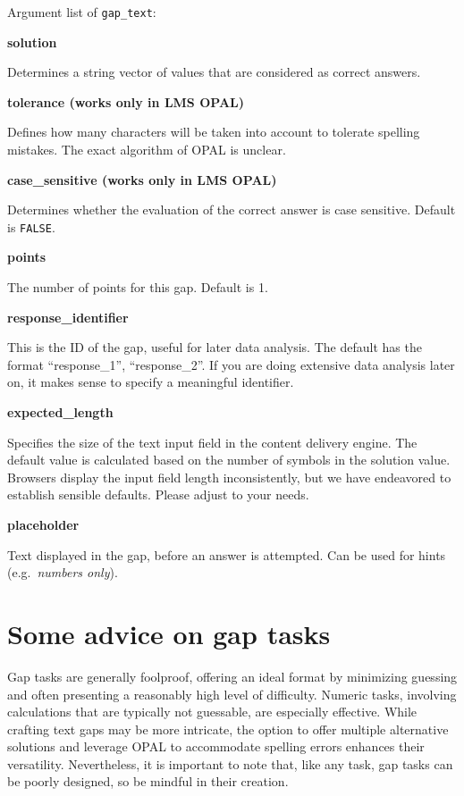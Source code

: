 \documentclass[twoside]{tufte-book}
\begin{document}
Argument list of \texttt{gap\_text}:

\noindent\textbf{solution}\label{solution-1}

Determines a string vector of values that are considered as correct answers.

\noindent\textbf{tolerance (works only in LMS OPAL)}\label{tolerance-works-only-in-lms-opal}

Defines how many characters will be taken into account to tolerate spelling mistakes. The exact algorithm of OPAL is unclear.

\noindent\textbf{case\_sensitive (works only in LMS OPAL)}\label{case_sensitive-works-only-in-lms-opal}

Determines whether the evaluation of the correct answer is case sensitive. Default is \texttt{FALSE}.

\noindent\textbf{points}\label{points-3}

The number of points for this gap. Default is 1.

\noindent\textbf{response\_identifier}\label{response_identifier-1}

This is the ID of the gap, useful for later data analysis. The default has the format ``response\_1'', ``response\_2''. If you are doing extensive data analysis later on, it makes sense to specify a meaningful identifier.

\noindent\textbf{expected\_length}\label{expected_length-1}

Specifies the size of the text input field in the content delivery engine. The default value is calculated based on the number of symbols in the solution value. Browsers display the input field length inconsistently, but we have endeavored to establish sensible defaults. Please adjust to your needs.

\noindent\textbf{placeholder}\label{placeholder-1}

Text displayed in the gap, before an answer is attempted. Can be used for hints (e.g.~\emph{numbers only}).

\section{Some advice on gap tasks}\label{some-advice-on-gap-tasks}

Gap tasks are generally foolproof, offering an ideal format by minimizing guessing and often presenting a reasonably high level of difficulty. Numeric tasks, involving calculations that are typically not guessable, are especially effective. While crafting text gaps may be more intricate, the option to offer multiple alternative solutions and leverage OPAL to accommodate spelling errors enhances their versatility. Nevertheless, it is important to note that, like any task, gap tasks can be poorly designed, so be mindful in their creation.
\end{document}
